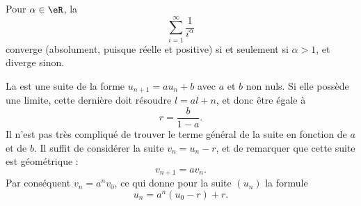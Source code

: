 \begin{example}
    Pour $\alpha \in \eR$, la 
    \begin{equation}        \label{EqSerRiem}
        \sum_{i=1}^\infty \frac1{i^\alpha}
    \end{equation}
    converge (absolument, puisque réelle et positive) si et seulement si $\alpha > 1$, et diverge sinon.
\end{example}

\begin{example}
    La  est une suite de la forme \( u_{n+1}=au_n+b\) avec \( a\) et \( b\) non nuls. Si elle possède une limite, cette dernière doit résoudre \( l=al+n\), et donc être égale à 
    \begin{equation}
        r=\frac{ b }{ 1-a }.
    \end{equation}
    Il n'est pas très compliqué de trouver le terme général de la suite en fonction de \( a\) et de \( b\). Il suffit de considérer la suite \( v_n=u_n-r\), et de remarquer que cette suite est géométrique :
    \begin{equation}
        v_{n+1}=av_n.
    \end{equation}
    Par conséquent \( v_n=a^nv_0\), ce qui donne pour la suite \( (u_n)\) la formule
    \begin{equation}
        u_n=a^n(u_0-r)+r.
    \end{equation}
\end{example}
